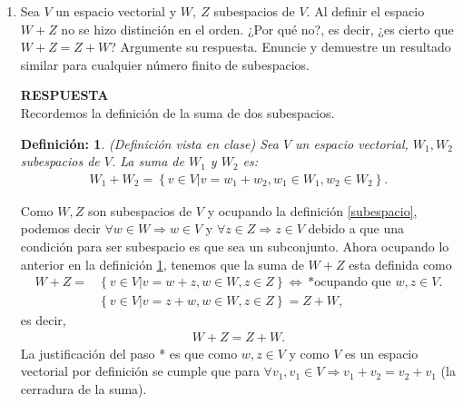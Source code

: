 \documentclass[11pt,letterpaper]{article}
\newcommand{\res}{\textbf{RESPUESTA}\\}
\newcommand{\gen}{\text{gen}}
\newtheorem{thmd}{Definición:}
\begin{document}
\begin{enumerate}
\textbf{Nota:} Lo anterior igual se puede probar utilizando la definición de dependencia/independecia entre vectores, es decir, si probamos que los vectores de $S$ y un vector $u$ son linealmente independientes podemos decir que $u$ no esta en el $\gen(S)$, y si son linealmente dependientes entonces $u$ si esta en $\gen(S)$. 
\item Sea $V$ un espacio vectorial y $W, \ Z$ subespacios de $V$. Al definir el espacio $W+Z$ no se hizo distinción en el orden. ¿Por qué no?, es decir, ¿es cierto que
$W + Z = Z + W$? Argumente su respuesta. Enuncie y demuestre un resultado similar para cualquier número finito de subespacios.

\res 
Recordemos la definición de la suma de dos subespacios.
\begin{framed}
    \begin{thmd} \label{suma_subespacios}
    (Definición vista en clase) Sea $V$ un espacio vectorial, $W_1,W_2$ subespacios de $V$. La suma de $W_1$ y $W_2$ es:
    \begin{align*}
    W_1+W_2=\left\{v\in V|v=w_1+w_2, w_1\in W_1, w_2\in W_2 \right\}.
    \end{align*}
    \end{thmd}
\end{framed} 
Como $W, Z$ son subespacios de $V$ y ocupando la definición \ref{subespacio}, podemos decir $\forall w\in W\Rightarrow w\in V$ y $\forall z\in Z\Rightarrow z\in V$ debido a que una condición para ser subespacio es que sea un subconjunto. Ahora ocupando lo anterior en la definición \ref{suma_subespacios}, tenemos que la suma de $W+Z$ esta definida como
\begin{align*}
    W+Z=&\left\{v\in V|v=w+z, w\in W, z\in Z \right\}\Leftrightarrow \ \text{*ocupando que }w,z\in V.\\
    &\left\{v\in V|v=z+w, w\in W, z\in Z \right\}=Z+W,
\end{align*}
es decir,
\begin{align*}
W+Z=Z+W.
\end{align*}
La justificación del paso * es que como $w,z\in V$ y como $V$ es un espacio vectorial por definición se cumple que para $\forall v_1,v_1\in V \Rightarrow v_1+v_2=v_2+v_1$ (la cerradura de la suma).\\


\end{enumerate}
\end{document}
